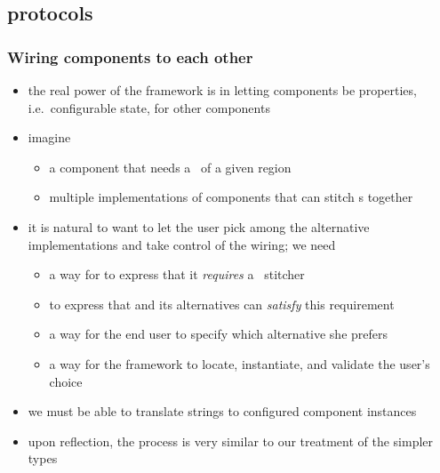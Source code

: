 \begin{frame}
%
  \frametitle{}
%
\end{frame}

\subsection{protocols}
\begin{frame}
%
  \frametitle{Wiring components to each other}
%
  \begin{itemize}
%
  \item the real power of the framework is in letting components be properties,
    i.e.~configurable state, for other components
%
  \item imagine
    \begin{itemize}
    \item a component  that needs a \dem\ of a given region
    \item multiple implementations of components that can stitch {\dem}s together
    \end{itemize}
%
  \item it is natural to want to let the user pick among the alternative implementations and
    take control of the wiring; we need
%
    \begin{itemize}
    \item a way for  to express that it \emph{requires} a \dem\
      stitcher
    \item to express that  and its alternatives can \emph{satisfy} this
      requirement
    \item a way for the end user to specify which alternative she prefers
    \item a way for the framework to locate, instantiate, and validate the user's choice
    \end{itemize}
%
  \item we must be able to translate strings to configured component instances
%
  \item upon reflection, the process is very similar to our treatment of the simpler types
%
  \end{itemize}
%
\end{frame}

